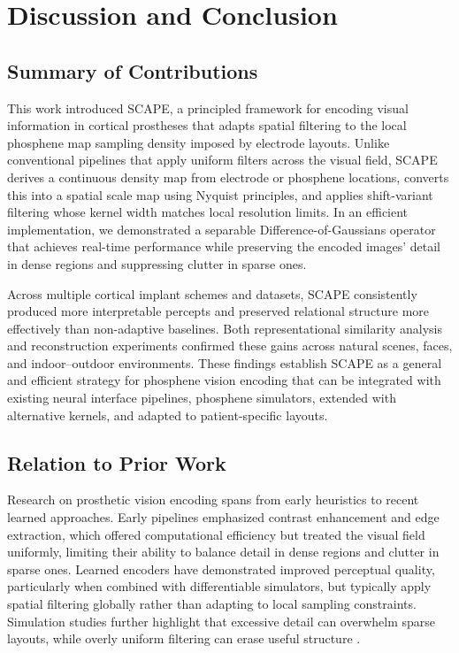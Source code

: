 \section{Discussion and Conclusion}

\subsection{Summary of Contributions}
This work introduced SCAPE, a principled framework for encoding visual information in cortical prostheses that adapts spatial filtering to the local phosphene map sampling density imposed by electrode layouts. Unlike conventional pipelines that apply uniform filters across the visual field, SCAPE derives a continuous density map from electrode or phosphene locations, converts this into a spatial scale map using Nyquist principles, and applies shift-variant filtering whose kernel width matches local resolution limits. In an efficient implementation, we demonstrated a separable Difference-of-Gaussians operator that achieves real-time performance while preserving the encoded images’ detail in dense regions and suppressing clutter in sparse ones.

Across multiple cortical implant schemes and datasets, SCAPE consistently produced more interpretable percepts and preserved relational structure more effectively than non-adaptive baselines. Both representational similarity analysis and reconstruction experiments confirmed these gains across natural scenes, faces, and indoor–outdoor environments. These findings establish SCAPE as a general and efficient strategy for phosphene vision encoding that can be integrated with existing neural interface pipelines\cite{Lozano2020}, phosphene simulators\cite{vanderGrinten2024, Fine2024, Beyeler2017}, extended with alternative kernels, and adapted to patient-specific layouts.

\subsection{Relation to Prior Work}
Research on prosthetic vision encoding spans from early heuristics to recent learned approaches. Early pipelines emphasized contrast enhancement and edge extraction, which offered computational efficiency but treated the visual field uniformly, limiting their ability to balance detail in dense regions and clutter in sparse ones. Learned encoders have demonstrated improved perceptual quality, particularly when combined with differentiable simulators, but typically apply spatial filtering globally rather than adapting to local sampling constraints. Simulation studies further highlight that excessive detail can overwhelm sparse layouts, while overly uniform filtering can erase useful structure \cite{Han2021,Kasowski2022}.

